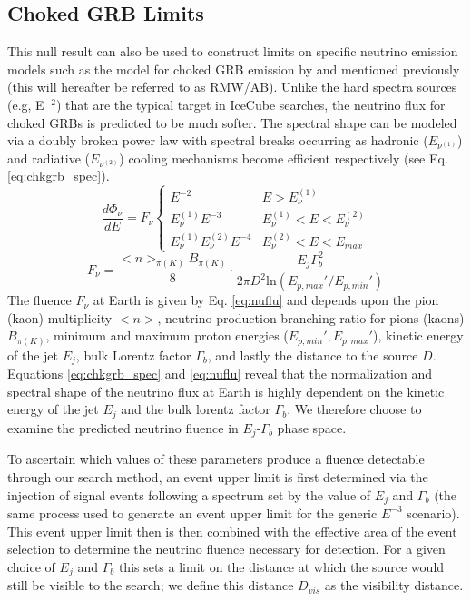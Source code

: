 \documentclass[manuscript]{aastex}
\begin{document}
\subsection{Choked GRB Limits}
This null result can also be used to construct limits on specific neutrino emission models such as the model for choked GRB emission by \cite{2004PhRvL..93r1101R} and \cite{2005PhRvL..95f1103A} mentioned previously (this will hereafter be referred to as RMW/AB). Unlike the hard spectra sources (e.g, E$^{-2}$) that are the typical target in IceCube searches, the neutrino flux for choked GRBs is predicted to be much softer. The spectral shape can be modeled via a doubly broken power law with spectral breaks occurring as hadronic ($E_{\nu^{(1)}}$) and radiative ($E_{\nu^{(2)}}$) cooling mechanisms become efficient respectively (see Eq. \ref{eq:chkgrb_spec}). 
\begin{equation}\label{eq:chkgrb_spec}
\frac{d\Phi_\nu}{dE}=F_\nu\left\{\begin{array}{cc}
E^{-2} & E > E_{\nu}^{(1)} \\ 
E_{\nu}^{(1)}E^{-3} & E_{\nu}^{(1)}< E < E_{\nu}^{(2)} \\ 
E_{\nu}^{(1)}E_{\nu}^{(2)}E^{-4} & E_{\nu}^{(2)}< E < E_{max}
\end{array}\right.
\end{equation}
\begin{equation}\label{eq:nuflu}
F_{\nu} = \frac{<n>_{\pi(K)}B_{\pi(K)}}{8} \cdot \frac{E_j \Gamma_b^2}{2 \pi D^2 \textrm{ln}(E_{p,max}'/ E_{p,min}')}
\end{equation}
The fluence $F_\nu$ at Earth is given by Eq. \ref{eq:nuflu} and depends upon the pion (kaon) multiplicity $<n>$, neutrino production branching ratio for pions (kaons) $B_{\pi(K)}$, minimum and maximum proton energies ($E_{p,min}', E_{p,max}'$), kinetic energy of the jet $E_j$, bulk Lorentz factor $\Gamma_b$, and lastly the distance to the source $D$. Equations \ref{eq:chkgrb_spec} and \ref{eq:nuflu} reveal that the normalization and spectral shape of the neutrino flux at Earth is highly dependent on the kinetic energy of the jet $E_j$ and the bulk lorentz factor $\Gamma_b$. We therefore choose to examine the predicted neutrino fluence in $E_j$-$\Gamma_b$ phase space. 

To ascertain which values of these parameters produce a fluence detectable through our search method, an event upper limit is first determined via the injection of signal events following a spectrum set by the value of $E_j$ and $\Gamma_b$ (the same process used to generate an event upper limit for the generic $E^{-3}$ scenario). This event upper limit then is then combined with the effective area of the event selection to determine the neutrino fluence necessary for detection. For a given choice of $E_j$ and $\Gamma_b$ this sets a limit on the distance at which the source would still be visible to the search; we define this distance $D_{vis}$ as the visibility distance.
\end{document}
